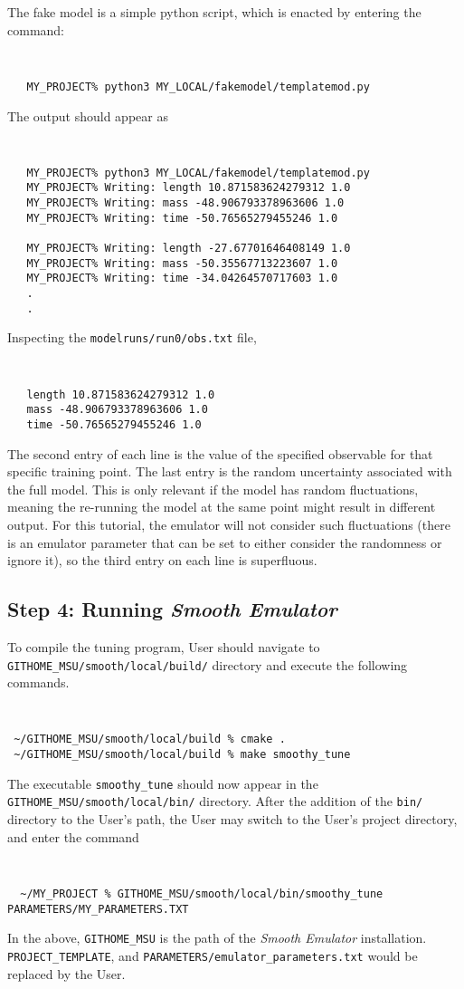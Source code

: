 \documentclass[UserManual.tex]{subfiles}
\begin{document}
The fake model is a simple python script, which is enacted by entering the command:
\vspace{-20pt}
{\tt
\begin{verbatim}
   MY_PROJECT% python3 MY_LOCAL/fakemodel/templatemod.py
\end{verbatim}
}
The output should appear as
\vspace{-20pt}
{\tt
\begin{verbatim}
   MY_PROJECT% python3 MY_LOCAL/fakemodel/templatemod.py
   MY_PROJECT% Writing: length 10.871583624279312 1.0
   MY_PROJECT% Writing: mass -48.906793378963606 1.0
   MY_PROJECT% Writing: time -50.76565279455246 1.0

   MY_PROJECT% Writing: length -27.67701646408149 1.0
   MY_PROJECT% Writing: mass -50.35567713223607 1.0
   MY_PROJECT% Writing: time -34.04264570717603 1.0
   .
   .
\end{verbatim}
}
Inspecting the {\tt modelruns/run0/obs.txt} file,
\vspace{-20pt}
{\tt
\begin{verbatim}
   length 10.871583624279312 1.0
   mass -48.906793378963606 1.0
   time -50.76565279455246 1.0
\end{verbatim}
}
The second entry of each line is the value of the specified observable for that specific training point. The last entry is the random uncertainty associated with the full model. This is only relevant if the model has random fluctuations, meaning the re-running the model at the same point might result in different output. For this tutorial, the emulator will not consider such fluctuations (there is an emulator parameter that can be set to either consider the randomness or ignore it), so the third entry on each line is superfluous.

\subsection{Step 4: Running {\it Smooth Emulator}}
To compile the tuning program, User should navigate to {\tt GITHOME\_MSU/smooth/local/build/} directory and execute the following commands.
{\tt
\begin{verbatim}
 ~/GITHOME_MSU/smooth/local/build % cmake .
 ~/GITHOME_MSU/smooth/local/build % make smoothy_tune
\end{verbatim}
}
The executable {\tt smoothy\_tune} should now appear in the {\tt GITHOME\_MSU/smooth/local/bin/} directory. After the addition of the {\tt bin/} directory to the User's path, the User may switch to the User's project directory, and enter the command
{\tt
\begin{verbatim}
  ~/MY_PROJECT % GITHOME_MSU/smooth/local/bin/smoothy_tune PARAMETERS/MY_PARAMETERS.TXT
\end{verbatim}
}
In the above, {\tt GITHOME\_MSU} is the path of the {\it Smooth Emulator} installation. {\tt PROJECT\_TEMPLATE}, and {\tt PARAMETERS/emulator\_parameters.txt} would be replaced by the User.
\end{document}
